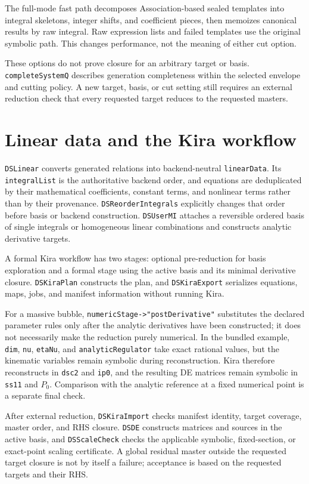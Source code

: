 ﻿\documentclass[a4paper,11pt]{article}
\begin{document}
The full-mode fast path decomposes Association-based sealed templates into integral
skeletons, integer shifts, and coefficient pieces, then memoizes canonical results by raw
integral. Raw expression lists and failed templates use the original symbolic path. This
changes performance, not the meaning of either cut option.

These options do not prove closure for an arbitrary target or basis.
\texttt{completeSystemQ} describes generation completeness within the selected envelope
and cutting policy. A new target, basis, or cut setting still requires an external
reduction check that every requested target reduces to the requested masters.

\section{Linear data and the Kira workflow}

\texttt{DSLinear} converts generated relations into backend-neutral \texttt{linearData}.
Its \texttt{integralList} is the authoritative backend order, and equations are deduplicated
by their mathematical coefficients, constant terms, and nonlinear terms rather than by
their provenance. \texttt{DSReorderIntegrals} explicitly changes that order before basis
or backend construction. \texttt{DSUserMI} attaches a reversible ordered basis of single
integrals or homogeneous linear combinations and constructs analytic derivative targets.

A formal Kira workflow has two stages: optional pre-reduction for basis exploration and a
formal stage using the active basis and its minimal derivative closure. \texttt{DSKiraPlan}
constructs the plan, and \texttt{DSKiraExport} serializes equations, maps, jobs, and manifest
information without running Kira.

For a massive bubble, \texttt{numericStage->"postDerivative"} substitutes the declared
parameter rules only after the analytic derivatives have been constructed; it does not
necessarily make the reduction purely numerical. In the bundled example, \texttt{dim},
\texttt{nu}, \texttt{etaNu}, and \texttt{analyticRegulator} take exact rational values,
but the kinematic variables remain symbolic during reconstruction. Kira therefore
reconstructs in \texttt{dsc2} and \texttt{ip0}, and the resulting DE matrices remain
symbolic in \texttt{ss11} and $P_0$. Comparison with the analytic reference at a fixed
numerical point is a separate final check.

After external reduction, \texttt{DSKiraImport} checks manifest identity, target coverage,
master order, and RHS closure. \texttt{DSDE} constructs matrices and sources in the active
basis, and \texttt{DSScaleCheck} checks the applicable symbolic, fixed-section, or exact-point
scaling certificate. A global residual master outside the requested target closure is not
by itself a failure; acceptance is based on the requested targets and their RHS.
\end{document}
